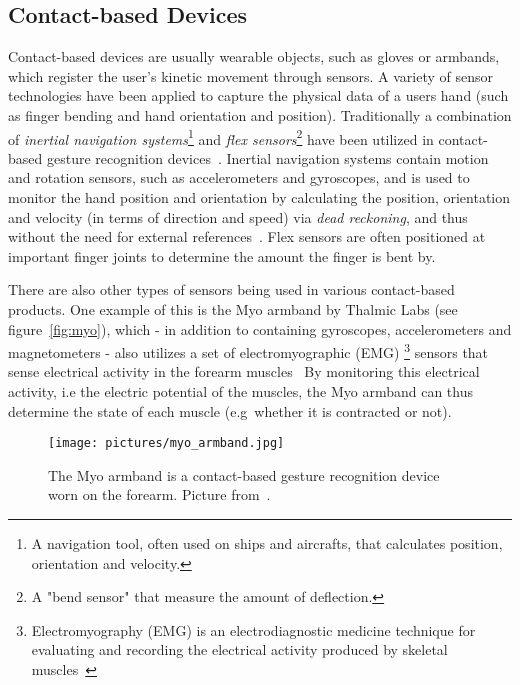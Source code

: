 \subsection{Contact-based Devices} 
Contact-based devices are usually wearable objects, such as gloves or armbands, 
which register the user's kinetic movement through sensors. %
A variety of sensor technologies have been applied to capture the physical data of a users hand (such as finger bending and hand orientation and position).
Traditionally a combination of \textit{inertial navigation systems}\footnote{A navigation tool, often used on ships and aircrafts, that calculates position, orientation and velocity.} 
and \textit{flex sensors}\footnote{A "bend sensor" that measure the amount of deflection.} have been utilized in contact-based gesture recognition devices~\citep{Sturman1994}. 
Inertial navigation systems contain motion and rotation sensors, such as accelerometers and gyroscopes, and is used to monitor the hand position and orientation by
calculating the position, orientation and velocity (in terms of direction and speed) via \textit{dead reckoning}, and thus without the need for external references~\citep{Berg1970}.
Flex sensors are often positioned at important finger joints to determine the amount the finger is bent by. 

There are also other types of sensors being used in various contact-based products. 
One example of this is the Myo armband by Thalmic Labs (see figure~\vref{fig:myo}), which - in addition to containing gyroscopes, accelerometers and magnetometers - also utilizes 
a set of electromyographic (EMG)
\footnote{Electromyography (EMG) is an electrodiagnostic medicine technique for evaluating and recording the electrical activity produced by skeletal muscles~\citep{Kamen2004}}
sensors that sense electrical activity in the forearm muscles~\citep{Myo2015} 
By monitoring this electrical activity, i.e the electric potential of the muscles, the Myo armband can thus determine the state of each muscle (e.g~whether it is contracted or not).


\begin{figure}%
	\texttt{[image: pictures/myo\_armband.jpg]}
	\caption[The Myo armband]{The Myo armband is a contact-based gesture recognition device worn on the forearm. Picture from~\citet{Myo2015}.}
	\label{fig:myo}
\end{figure}

